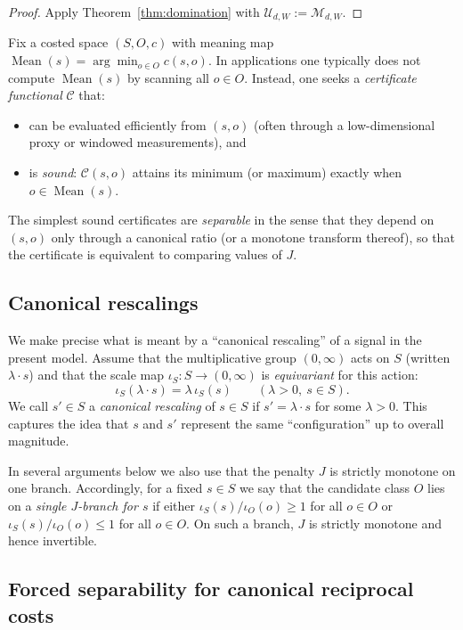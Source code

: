 \documentclass[11pt,reqno]{amsart}
\theoremstyle{definition}
\theoremstyle{remark}
\newcommand{\1}{\mathbf{1}}
\newcommand{\Mean}{\operatorname{Mean}}
\begin{document}
\begin{proof}
Apply Theorem~\ref{thm:domination} with $\mathcal U_{d,W}:=\mathcal M_{d,W}$.
\end{proof}



Fix a costed space $(S,O,c)$ with meaning map $\Mean(s)=\arg\min_{o\in O}c(s,o)$.
In applications one typically does not compute $\Mean(s)$ by scanning all $o\in O$.
Instead, one seeks a \emph{certificate functional} $\mathcal{C}$ that:

\begin{itemize}
\item can be evaluated efficiently from $(s,o)$ (often through a low-dimensional
 proxy or windowed measurements), and
\item is \emph{sound}: $\mathcal{C}(s,o)$ attains its minimum (or maximum) exactly
 when $o\in\Mean(s)$.
\end{itemize}

The simplest sound certificates are \emph{separable} in the sense that they depend
on $(s,o)$ only through a canonical ratio (or a monotone transform thereof), so
that the certificate is equivalent to comparing values of $J$.

\subsection{Canonical rescalings}\label{subsec:canon-rescale}

We make precise what is meant by a ``canonical rescaling'' of a signal in the present model.
Assume that the multiplicative group $(0,\infty)$ acts on $S$ (written $\lambda\cdot s$) and that
the scale map $\iota_S:S\to(0,\infty)$ is \emph{equivariant} for this action:
\[
\iota_S(\lambda\cdot s)=\lambda\,\iota_S(s)\qquad(\lambda>0,\ s\in S).
\]
We call $s' \in S$ a \emph{canonical rescaling} of $s\in S$ if $s'=\lambda\cdot s$ for some $\lambda>0$.
This captures the idea that $s$ and $s'$ represent the same ``configuration'' up to overall magnitude.

In several arguments below we also use that the penalty $J$ is strictly monotone on one branch.
Accordingly, for a fixed $s\in S$ we say that the candidate class $O$ lies on a \emph{single $J$-branch for $s$} if either
$\iota_S(s)/\iota_O(o)\ge 1$ for all $o\in O$ or $\iota_S(s)/\iota_O(o)\le 1$ for all $o\in O$.
On such a branch, $J$ is strictly monotone and hence invertible.

\subsection{Forced separability for canonical reciprocal costs}
\end{document}
